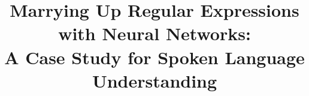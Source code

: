 \documentclass[11pt,a4paper]{article}
\title{Marrying Up Regular Expressions with Neural Networks: \\A Case Study for Spoken Language Understanding}
\author{Bingfeng Luo$^1$, Yansong Feng$^{*1}$, Zheng Wang$^2$,
	\\\textbf{Songfang Huang$^4$, Rui Yan$^1$ \and Dongyan Zhao$^1$}\\
	$^1$ICST, Peking University, China\\
	$^2$MetaLab, Lancaster University, UK \\
	$^3$IBM China Research Lab, China \\
	{\tt \{bf\_luo,fengyansong,zhanxing.zhu,ruiyan,zhaody\}@pku.edu.cn} \\
	{\tt z.wang@lancaster.ac.uk} \\
	{\tt huangsf@cn.ibm.com} \\}
\date{}
\begin{document}
\maketitle

















\balance
\end{document}
